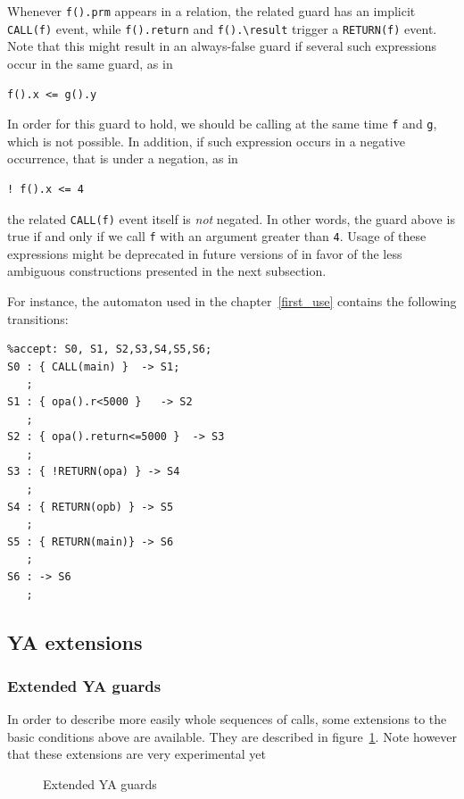 \documentclass{report}
\begin{document}
Whenever \lstinline|f().prm| appears in a relation, the
related guard has an implicit \lstinline|CALL(f)| event, while 
\lstinline|f().return|
and \lstinline|f().\result| trigger a \lstinline|RETURN(f)| event. 
Note that this might result in an always-false guard if several such 
expressions occur in the same guard, as in
\begin{lstlisting}[language=ya]
f().x <= g().y
\end{lstlisting}
In order for this guard to hold, we should be calling at the same time \verb+f+
and \verb+g+, which is not possible. In addition, if such expression occurs in
a negative occurrence, that is under a negation, as in
\begin{lstlisting}[language=ya]
! f().x <= 4
\end{lstlisting}
the related \lstinline|CALL(f)| event itself is {\it not} negated. 
In other words, 
the guard above is true if and only if we call \lstinline|f| with an argument
greater than \lstinline|4|. Usage of these expressions might be deprecated in
future versions of \aorai in favor of the less ambiguous constructions 
presented in the next subsection.

For instance, the automaton used in the chapter~\ref{first_use} contains the
following transitions:
\begin{lstlisting}[language=ya]
%init: S0;
%accept: S0, S1, S2,S3,S4,S5,S6;
S0 : { CALL(main) }  -> S1;
   ;
S1 : { opa().r<5000 }   -> S2
   ;
S2 : { opa().return<=5000 }  -> S3
   ;
S3 : { !RETURN(opa) } -> S4
   ;
S4 : { RETURN(opb) } -> S5
   ;
S5 : { RETURN(main)} -> S6
   ;
S6 : -> S6
   ;
\end{lstlisting}

\subsection{YA extensions}\label{sec:ya-extensions}
\subsubsection{Extended YA guards}
In order to describe more easily whole sequences of calls, some extensions to
the basic conditions above are available. They are described in
figure~\ref{fig:ya-extensions}. Note however that these extensions are very
experimental yet

\lstset{language=ya}

\begin{figure}[ht]
  
  \caption{Extended YA guards}
  \label{fig:ya-extensions}
\end{figure}
\end{document}
